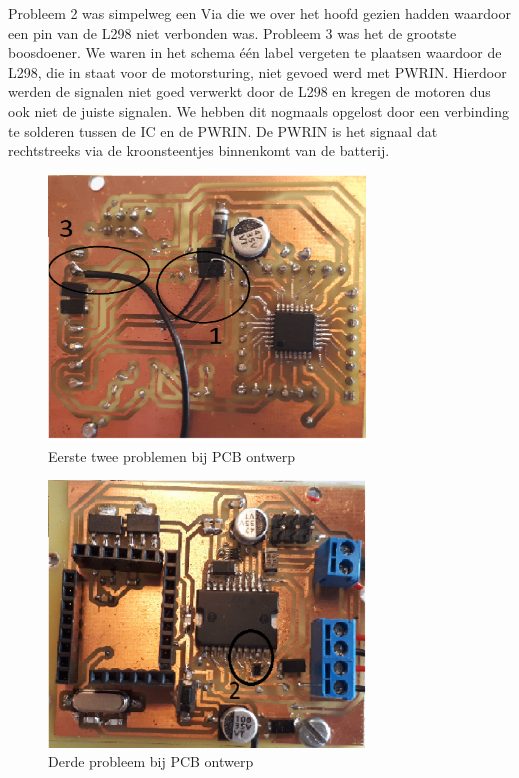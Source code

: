 Probleem 2 was simpelweg een Via die we over het hoofd gezien hadden waardoor een pin van de L298 niet verbonden was. 
Probleem 3 was het de grootste boosdoener. We waren in het schema \'e\'en label vergeten te plaatsen waardoor de L298, die in staat voor de motorsturing, niet gevoed werd met PWRIN. Hierdoor werden de signalen niet goed verwerkt door de L298 en kregen de motoren dus ook niet de juiste signalen. We hebben dit nogmaals opgelost door een verbinding te solderen tussen de IC en de PWRIN. De PWRIN is het signaal dat rechtstreeks via de kroonsteentjes binnenkomt van de batterij.
\begin{figure}[h]
\centering
\includegraphics[width=0.75\textwidth]{PCBProblemenVoorkant.png}
\caption{Eerste twee problemen bij PCB ontwerp}
\label{fig:prob1}
\end{figure}

\begin{figure}[h]
\centering
\includegraphics[width=0.75\textwidth]{PCBProblemenAchterkant.png}
\caption{Derde probleem bij PCB ontwerp}
\label{fig:prob3}
\end{figure}




